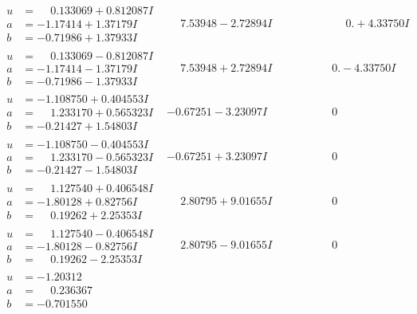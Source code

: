 \documentclass[1p]{elsarticle_modified}
\theoremstyle{definition}
\begin{document}
$$\begin{array}{c|c|c}
\begin{aligned}
u &= \phantom{-}0.133069 + 0.812087 I \\
a &= -1.17414 + 1.37179 I \\
b &= -0.71986 + 1.37933 I\end{aligned}
 & \phantom{-}7.53948 - 2.72894 I & \phantom{-0.000000 -}0. + 4.33750 I \\ \hline\begin{aligned}
u &= \phantom{-}0.133069 - 0.812087 I \\
a &= -1.17414 - 1.37179 I \\
b &= -0.71986 - 1.37933 I\end{aligned}
 & \phantom{-}7.53948 + 2.72894 I & \phantom{-0.000000 } 0. - 4.33750 I \\ \hline\begin{aligned}
u &= -1.108750 + 0.404553 I \\
a &= \phantom{-}1.233170 + 0.565323 I \\
b &= -0.21427 + 1.54803 I\end{aligned}
 & -0.67251 - 3.23097 I & \phantom{-0.000000 } 0 \\ \hline\begin{aligned}
u &= -1.108750 - 0.404553 I \\
a &= \phantom{-}1.233170 - 0.565323 I \\
b &= -0.21427 - 1.54803 I\end{aligned}
 & -0.67251 + 3.23097 I & \phantom{-0.000000 } 0 \\ \hline\begin{aligned}
u &= \phantom{-}1.127540 + 0.406548 I \\
a &= -1.80128 + 0.82756 I \\
b &= \phantom{-}0.19262 + 2.25353 I\end{aligned}
 & \phantom{-}2.80795 + 9.01655 I & \phantom{-0.000000 } 0 \\ \hline\begin{aligned}
u &= \phantom{-}1.127540 - 0.406548 I \\
a &= -1.80128 - 0.82756 I \\
b &= \phantom{-}0.19262 - 2.25353 I\end{aligned}
 & \phantom{-}2.80795 - 9.01655 I & \phantom{-0.000000 } 0 \\ \hline\begin{aligned}
u &= -1.20312\phantom{ +0.000000I} \\
a &= \phantom{-}0.236367\phantom{ +0.000000I} \\
b &= -0.701550\phantom{ +0.000000I}\end{aligned}

\end{array}$$
\end{document}
